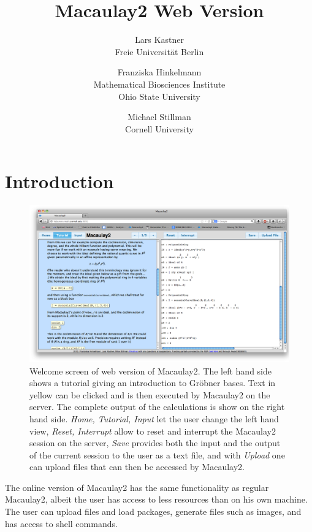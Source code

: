 \documentclass[]{article}
\title{Macaulay2 Web Version}
\author{Lars Kastner\\ Freie Universit\"at Berlin \and 
Franziska Hinkelmann\\Mathematical Biosciences Institute\\ Ohio State University \and 
Michael Stillman\\Cornell University  }
\date{}
\begin{document}
\ifpdf
{}
\else
{}
\fi

\maketitle


\begin{abstract}
\end{abstract}

\section{Introduction}

\begin{figure}[htb]
    \includegraphics[width=.95\textwidth]{homeWebsite.jpg}
    \caption{Welcome screen of web version of Macaulay2. The left hand side shows a tutorial giving an introduction to Gr\"obner bases. Text in yellow can be clicked and is then executed by Macaulay2 on the server. The complete output of the calculations is show on the right hand side. {\it Home, Tutorial, Input} let the user change the left hand view, {\it Reset, Interrupt} allow to reset and interrupt the Macaulay2 session on the server, {\it Save}  provides both the input and the output of the current session to the user as a text file, and with {\it Upload} one can upload files that can then be accessed by Macaulay2.}
    \label{fig:home}
\end{figure}

The online version of Macaulay2 has the same functionality as regular Macaulay2, albeit the user has access to less resources than on his own machine. The user can upload files and load packages, generate files such as images, and has access to shell commands. 
\end{document}

